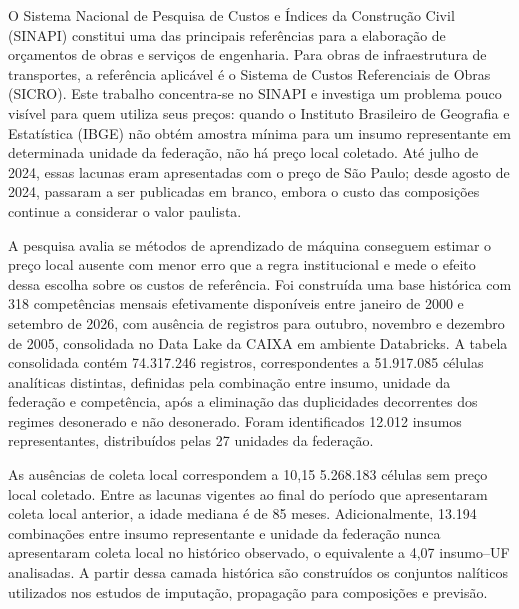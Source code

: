 
\begin{resumo}
O Sistema Nacional de Pesquisa de Custos e Índices da Construção Civil (SINAPI) 
constitui uma das principais referências para a elaboração de orçamentos de obras e 
serviços de engenharia. Para obras de infraestrutura de transportes, a referência 
aplicável é o Sistema de Custos Referenciais de Obras (SICRO). Este trabalho 
concentra-se no SINAPI e investiga um problema pouco visível para quem utiliza seus 
preços: quando o Instituto Brasileiro de Geografia e Estatística (IBGE) não obtém 
amostra mínima para um insumo representante em determinada unidade da federação, não há 
preço local coletado. Até julho de 2024, essas lacunas eram apresentadas com o preço de 
São Paulo; desde agosto de 2024, passaram a ser publicadas em branco, embora o custo das 
composições continue a considerar o valor paulista.

A pesquisa avalia se métodos de aprendizado de máquina conseguem estimar o preço local 
ausente com menor erro que a regra institucional e mede o efeito dessa escolha sobre os 
custos de referência. Foi construída uma base histórica com 318 competências mensais 
efetivamente disponíveis entre janeiro de 2000 e setembro de 2026, com ausência de 
registros para outubro, novembro e dezembro de 2005, consolidada no Data Lake da CAIXA 
em ambiente Databricks. A tabela consolidada contém 74.317.246 registros, correspondentes 
a 51.917.085 células analíticas distintas, definidas pela combinação entre insumo, 
unidade da federação e competência, após a eliminação das duplicidades decorrentes dos 
regimes desonerado e não desonerado. Foram identificados 12.012 insumos representantes, 
distribuídos pelas 27 unidades da federação.

As ausências de coleta local correspondem a 10,15%
5.268.183 células sem preço local coletado. Entre as lacunas vigentes ao final do período 
que apresentaram coleta local anterior, a idade mediana é de 85 meses. Adicionalmente, 
13.194 combinações entre insumo representante e unidade da federação nunca apresentaram 
coleta local no histórico observado, o equivalente a 4,07%
insumo–UF analisadas. A partir dessa camada histórica são construídos os conjuntos 
nalíticos utilizados nos estudos de imputação, propagação para composições e previsão.


\end{resumo}
